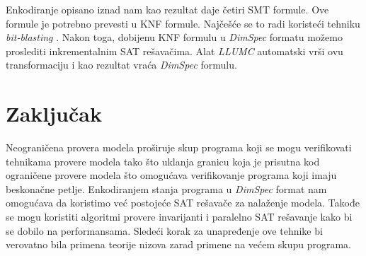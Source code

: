 \documentclass[a4paper]{article}
\theoremstyle{plain}
\theoremstyle{definition}
\begin{document}
Enkodiranje opisano iznad nam kao rezultat daje četiri SMT formule. Ove formule je potrebno prevesti u KNF formule. Najčešće se to radi koristeći tehniku \emph{bit-blasting} \cite{bitblasting}. Nakon toga, dobijenu KNF formulu u \emph{DimSpec} formatu
možemo proslediti inkrementalnim SAT rešavačima. Alat \emph{LLUMC} automatski vrši ovu transformaciju i kao rezultat vraća \emph{DimSpec} formulu.


\section{Zaključak}
\label{sec:Zakljucak}

Neograničena provera modela proširuje skup programa koji se mogu verifikovati tehnikama provere modela tako što uklanja granicu koja je prisutna kod ograničene provere modela što omogućava verifikovanje programa koji imaju beskonačne petlje. Enkodiranjem stanja programa u \emph{DimSpec} format nam omogućava da koristimo već postojeće SAT rešavače za nalaženje modela. Takođe se mogu koristiti algoritmi provere invarijanti i paralelno SAT rešavanje kako bi se dobilo na performansama. Sledeći korak za unapređenje ove tehnike bi verovatno bila primena teorije nizova zarad primene na većem skupu programa.


\appendix



\end{document}
